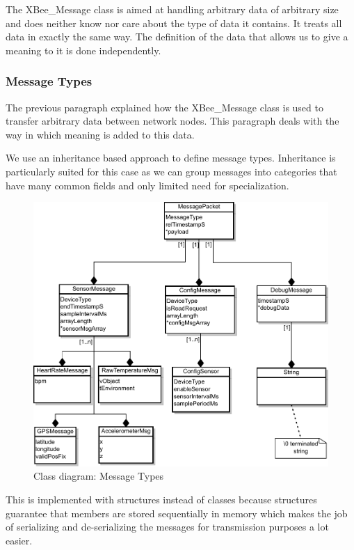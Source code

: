 The XBee\_Message class is aimed at handling arbitrary data of arbitrary size and does neither know nor care about the type of data it contains. It treats all data in exactly the same way. The definition of the data that allows us to give a meaning to it is done independently.

\subsubsection{Message Types}
\label{sec:message_types}
The previous paragraph explained how the XBee\_Message class is used to transfer arbitrary data between network nodes. This paragraph deals with the way in which meaning is added to this data.

We use an inheritance based approach to define message types. Inheritance is particularly suited for this case as we can group messages into categories that have many common fields and only limited need for specialization.

\begin{figure}
\includegraphics[width=\textwidth]{Images/message_types}
\caption{Class diagram: Message Types}
\label{fig:msg_types}
\end{figure}

This is implemented with structures instead of classes because structures guarantee that members are stored sequentially in memory which makes the job of serializing and de-serializing the messages for transmission purposes a lot easier.

